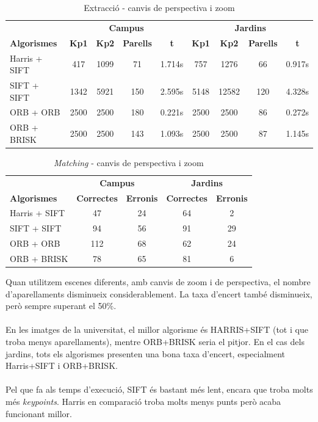 		\begin{table}[H]
			\begin{center}
				\begin{tabular}{l | c c c c | c c c c}
					& \multicolumn{4}{c|}{\textbf{Campus}} & \multicolumn{4}{c}{\textbf{Jardins}} \\
					\textbf{Algorismes} & \textbf{Kp1} & \textbf{Kp2} & \textbf{Parells} & \textbf{t} & \textbf{Kp1} & \textbf{Kp2} & \textbf{Parells} & \textbf{t} \\ \hline
					Harris + SIFT & 417 & 1099 & 71 & 1.714s & 757 & 1276 & 66 & 0.917s \\
					SIFT + SIFT & 1342 & 5921 & 150 & 2.595s & 5148 & 12582 & 120 & 4.328s \\
					ORB + ORB & 2500 & 2500 & 180 & 0.221s & 2500 & 2500 & 86 & 0.272s \\
					ORB + BRISK & 2500 & 2500 & 143 & 1.093s & 2500 & 2500 & 87 & 1.145s \\
				\end{tabular}
			\end{center}
			\caption{Extracció - canvis de perspectiva i zoom}
		\end{table}

		\begin{table}[H]
			\begin{center}
				\begin{tabular}{l | c c | c c}
					& \multicolumn{2}{c|}{\textbf{Campus}} & \multicolumn{2}{c}{\textbf{Jardins}} \\
					\textbf{Algorismes} & \textbf{Correctes} & \textbf{Erronis} & \textbf{Correctes} & \textbf{Erronis} \\ \hline
					Harris + SIFT & 47 & 24 & 64 & 2 \\
					SIFT + SIFT & 94 & 56 & 91 & 29 \\
					ORB + ORB & 112 & 68 & 62 & 24 \\
					ORB + BRISK & 78 & 65 & 81 & 6 \\
				\end{tabular}
			\end{center}
			\caption{\textit{Matching} - canvis de perspectiva i zoom}
		\end{table}
		\noindent
		Quan utilitzem escenes diferents, amb canvis de zoom i de perspectiva, el nombre d'aparellaments disminueix considerablement. La taxa d'encert també disminueix, però sempre superant el 50\%.\\\\
		En les imatges de la universitat, el millor algorisme és HARRIS+SIFT (tot i que troba menys aparellaments), mentre ORB+BRISK seria el pitjor. En el cas dels jardins, tots els algorismes presenten
		una bona taxa d'encert, especialment Harris+SIFT i ORB+BRISK.\\\\
		Pel que fa als temps d'execució, SIFT és bastant més lent, encara que troba molts més \textit{keypoints}. Harris en comparació troba molts menys punts però acaba funcionant millor.\\
		
